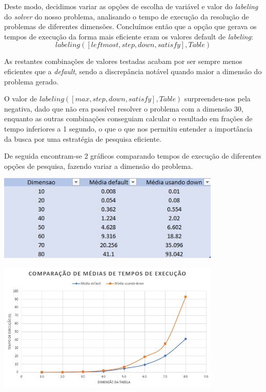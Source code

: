\documentclass[11pt]{article}
\begin{document}
Deste modo, decidimos variar as opções de escolha de variável e valor do \emph{labeling} do \emph{solver} do nosso problema, analisando o tempo de execução da resolução de problemas de diferentes dimensões.
Concluímos então que a opção que gerava os tempos de execução da forma mais eficiente eram os valores default de \emph{labeling}:  \[labeling([leftmost, step, down, satisfy],Table)\]

As restantes combinações de valores testadas acabam por ser sempre menos eficientes que a \emph{default}, sendo a discrepância notável quando maior a dimensão do problema gerado.

O valor de \(labeling([max, step, down, satisfy],Table)\) surpreendeu-nos pela negativa, dado que não era possível resolver o problema com a dimensão 30, enquanto as outras combinações conseguiam calcular o resultado em frações de tempo inferiores a 1 segundo, o que o que nos permitiu entender a importância da busca por uma estratégia de pesquisa eficiente.

De seguida encontram-se 2 gráficos comparando tempos de execução de diferentes opções de pesquisa, fazendo variar a dimensão do problema.

\bigskip

\begin{center}

	\includegraphics[width=0.8\textwidth]{tabela-comparacao.jpg}

	\includegraphics[width=0.8\textwidth]{grafico-comparacao.jpg}

\end{center}
\end{document}
